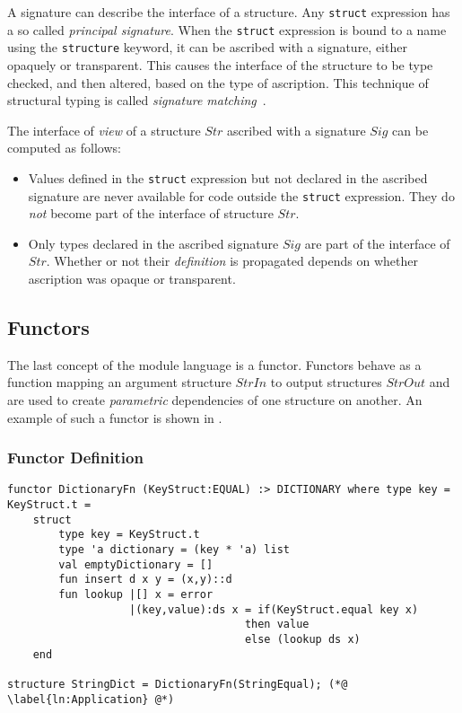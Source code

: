 \documentclass[11pt]{article}
\newcommand{\cmath}[1]{\ensuremath{\mathit{#1}}}
\begin{document}
A signature can describe the interface of a structure.
Any \lstinline{struct} expression has a so called \emph{principal signature}.
When the \lstinline{struct} expression is bound to a name using the \lstinline{structure} keyword, it can be ascribed with a signature, either opaquely or transparent.
This causes the interface of the structure to be type checked, and then altered, based on the type of ascription.
This technique of structural typing is called \emph{signature matching}~\cite{Pierce:Adv}.

The interface of \emph{view} of a structure \cmath{Str} ascribed with a signature \cmath{Sig} can be computed as follows:
\begin{itemize}
\item Values defined in the \lstinline{struct} expression but not declared in the ascribed signature are never available for code outside the \lstinline{struct} expression.
They do \emph{not} become part of the interface of structure \cmath{Str}.
\item
Only types declared in the ascribed signature \cmath{Sig} are part of the interface of \cmath{Str}.
Whether or not their \emph{definition} is propagated depends on whether ascription was opaque or transparent.
\end{itemize}

\subsection{Functors}
The last concept of the module language is a functor.
Functors behave as a function mapping an argument structure \cmath{StrIn} to output structures \cmath{StrOut} and are used to create \emph{parametric} dependencies of one structure on another.
An example of such a functor is shown in .

\subsubsection{Functor Definition}
\begin{lstlisting}[label={lst:DictionaryFunctorExample}, caption={The Dictionary as a functor. The structures and signatures that this example depends on are shown in {\protect\myref{lst}{lst:AdditionalSignatures}} in Appendix {\protect\ref{app:AdditionalCode}}.}]
functor DictionaryFn (KeyStruct:EQUAL) :> DICTIONARY where type key = KeyStruct.t =
    struct
        type key = KeyStruct.t
        type 'a dictionary = (key * 'a) list
        val emptyDictionary = []
        fun insert d x y = (x,y)::d
        fun lookup |[] x = error
                   |(key,value):ds x = if(KeyStruct.equal key x)
                                     then value
                                     else (lookup ds x)
    end
    
structure StringDict = DictionaryFn(StringEqual); (*@ \label{ln:Application} @*)
\end{lstlisting}
\end{document}
